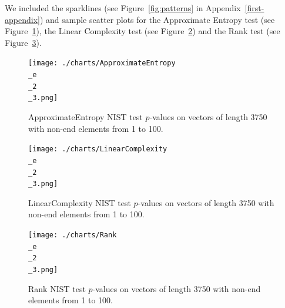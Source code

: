 \documentclass[oneside,12pt]{amsart}
\theoremstyle{definition}
\numberwithin{equation}{section}
\begin{document}

We included the sparklines (see Figure~\ref{fig:patterns} in Appendix~\ref{first-appendix}) and sample scatter plots for the Approximate Entropy test (see Figure~\ref{fig:approxentropy23}), the Linear Complexity test (see Figure~\ref{fig:linearcomplexity23}) and the Rank test (see Figure~\ref{fig:rank23}).  %




\vspace{1cm}

\begin{figure}[h!]
\centering
\caption{ApproximateEntropy NIST test $p$-values on vectors of length 3750 with non-end elements from 1 to 100.}
\texttt{[image: ./charts/ApproximateEntropy\\\_e\\\_2\\\_3.png]}
\label{fig:approxentropy23}
\end{figure}


\begin{figure}[h!]
\centering
\caption{LinearComplexity NIST test $p$-values on vectors of length 3750 with non-end elements from 1 to 100.}
\texttt{[image: ./charts/LinearComplexity\\\_e\\\_2\\\_3.png]}
\label{fig:linearcomplexity23}
\end{figure}

\begin{figure}[h!]
\centering
\caption{Rank NIST test $p$-values on vectors of length 3750 with non-end elements from 1 to 100.}
\texttt{[image: ./charts/Rank\\\_e\\\_2\\\_3.png]}
\label{fig:rank23}
\end{figure}



\clearpage
\appendix
\end{document}
